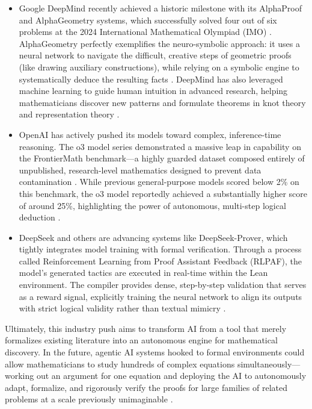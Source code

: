 \begin{itemize}
    \item Google DeepMind recently achieved a historic milestone with its AlphaProof and AlphaGeometry systems, which successfully solved four out of six problems at the 2024 International Mathematical Olympiad (IMO) \cite{doan_ai-assisted_2025}. AlphaGeometry perfectly exemplifies the neuro-symbolic approach: it uses a neural network to navigate the difficult, creative steps of geometric proofs (like drawing auxiliary constructions), while relying on a symbolic engine to systematically deduce the resulting facts \cite{murphy_autoformalizing_nodate-1}. DeepMind has also leveraged machine learning to guide human intuition in advanced research, helping mathematicians discover new patterns and formulate theorems in knot theory and representation theory \cite{avigad_mathematics_2024}.
    \item OpenAI has actively pushed its models toward complex, inference-time reasoning. The o3 model series demonstrated a massive leap in capability on the FrontierMath benchmark—a highly guarded dataset composed entirely of unpublished, research-level mathematics designed to prevent data contamination \cite{asperti_thinking_2026}. While previous general-purpose models scored below 2\% on this benchmark, the o3 model reportedly achieved a substantially higher score of around 25\%, highlighting the power of autonomous, multi-step logical deduction \cite{asperti_thinking_2026}.
    \item DeepSeek and others are advancing systems like DeepSeek-Prover, which tightly integrates model training with formal verification. Through a process called Reinforcement Learning from Proof Assistant Feedback (RLPAF), the model's generated tactics are executed in real-time within the Lean environment. The compiler provides dense, step-by-step validation that serves as a reward signal, explicitly training the neural network to align its outputs with strict logical validity rather than textual mimicry \cite{asperti_thinking_2026}.
\end{itemize}

Ultimately, this industry push aims to transform AI from a tool that merely formalizes existing literature into an autonomous engine for mathematical discovery. In the future, agentic AI systems hooked to formal environments could allow mathematicians to study hundreds of complex equations simultaneously—working out an argument for one equation and deploying the AI to autonomously adapt, formalize, and rigorously verify the proofs for large families of related problems at a scale previously unimaginable \cite{tao_machine-assisted_2025}.

